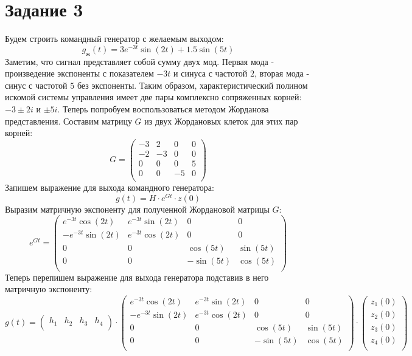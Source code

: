 \documentclass[a4paper, 12pt]{article}
\begin{document}
\section{Задание 3}
Будем строить командный генератор с желаемым выходом:
\[
    g_{\textit{ж}} (t) = 3e^{-3t} \sin{(2t)} + 1.5 \sin{(5t)}
\]
Заметим, что сигнал представляет собой сумму двух мод. Первая мода - произведение экспоненты с показателем $-3t$ и синуса с частотой $2$, вторая мода - синус с частотой $5$ без экспоненты. Таким образом, характеристический полином искомой системы управления имеет две пары комплексно сопряженных корней: $-3 \pm 2i$ и $\pm 5i$.
\newline
Теперь попробуем воспользоваться методом Жорданова представления. Составим матрицу $G$ из двух Жордановых клеток для этих пар корней:
\[
    G = \begin{pmatrix}
        -3 & 2 & 0 & 0 \\
        -2 & -3 & 0 & 0 \\
        0 & 0 & 0 & 5 \\
        0 & 0 & -5 & 0 \\
    \end{pmatrix}
\]
Запишем выражение для выхода командного генератора:
\[
    g(t) = H \cdot e^{Gt} \cdot z(0)
\]
Выразим матричную экспоненту для полученной Жордановой матрицы $G$:
\[
    e^{Gt} = \begin{pmatrix}
        e^{-3t}\cos{(2t)} & e^{-3t}\sin{(2t)} & 0 & 0 \\
        -e^{-3t}\sin{(2t)} & e^{-3t}\cos{(2t)} & 0 & 0 \\
        0 & 0 & \cos{(5t)} & \sin{(5t)} \\
        0 & 0 & -\sin{(5t)} & \cos{(5t)} \\
    \end{pmatrix}
\]
Теперь перепишем выражение для выхода генератора подставив в него матричную экспоненту:
\[
    g(t) = \begin{pmatrix}
        h_1 & h_2 & h_3 & h_4 \\
    \end{pmatrix} \cdot \begin{pmatrix}
        e^{-3t}\cos{(2t)} & e^{-3t}\sin{(2t)} & 0 & 0 \\
        -e^{-3t}\sin{(2t)} & e^{-3t}\cos{(2t)} & 0 & 0 \\
        0 & 0 & \cos{(5t)} & \sin{(5t)} \\
        0 & 0 & -\sin{(5t)} & \cos{(5t)} \\
    \end{pmatrix} \cdot \begin{pmatrix}
        z_1(0) \\
        z_2(0) \\
        z_3(0) \\
        z_4(0) \\
    \end{pmatrix}
\]
\end{document}
